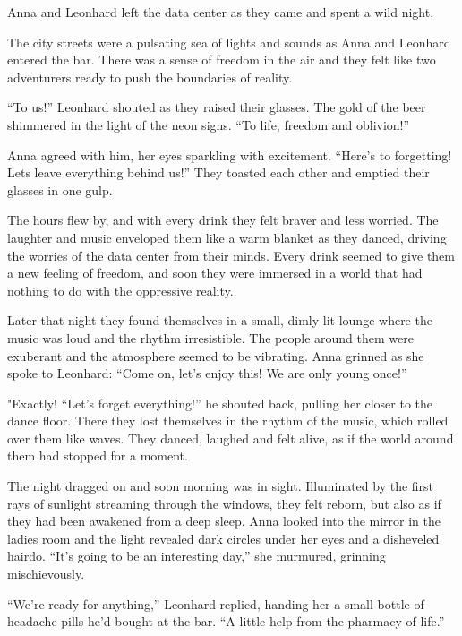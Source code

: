 \documentclass[
]{article}
\begin{document}
Anna and Leonhard left the data center as they came and spent a wild
night.

The city streets were a pulsating sea of \hspace{0pt}\hspace{0pt}lights
and sounds as Anna and Leonhard entered the bar. There was a sense of
freedom in the air and they felt like two adventurers ready to push the
boundaries of reality.

``To us!'' Leonhard shouted as they raised their glasses. The gold of
the beer shimmered in the light of the neon signs. ``To life, freedom
and oblivion!''

Anna agreed with him, her eyes sparkling with excitement. ``Here's to
forgetting! Let\textquotesingle s leave everything behind us!'' They
toasted each other and emptied their glasses in one gulp.

The hours flew by, and with every drink they felt braver and less
worried. The laughter and music enveloped them like a warm blanket as
they danced, driving the worries of the data center from their minds.
Every drink seemed to give them a new feeling of freedom, and soon they
were immersed in a world that had nothing to do with the oppressive
reality.

Later that night they found themselves in a small, dimly lit lounge
where the music was loud and the rhythm irresistible. The people around
them were exuberant and the atmosphere seemed to be vibrating. Anna
grinned as she spoke to Leonhard: ``Come on, let's enjoy this! We are
only young once!''

"Exactly! ``Let's forget everything!'' he shouted back, pulling her
closer to the dance floor. There they lost themselves in the rhythm of
the music, which rolled over them like waves. They danced, laughed and
felt alive, as if the world around them had stopped for a moment.

The night dragged on and soon morning was in sight. Illuminated by the
first rays of sunlight streaming through the windows, they felt reborn,
but also as if they had been awakened from a deep sleep. Anna looked
into the mirror in the ladies\textquotesingle{} room and the light
revealed dark circles under her eyes and a disheveled hairdo. ``It's
going to be an interesting day,'' she murmured, grinning mischievously.

``We're ready for anything,'' Leonhard replied, handing her a small
bottle of headache pills he'd bought at the bar. ``A little help from
the pharmacy of life.''
\end{document}
